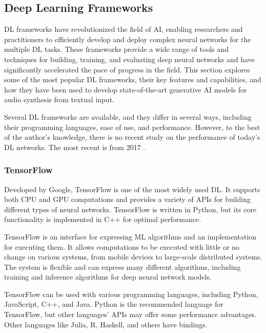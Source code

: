  \subsection{Deep Learning Frameworks} \label{sec:dl-frameworks}

\Ac{DL} frameworks have revolutionized the field of \ac{AI}, enabling researchers and practitioners to efficiently develop and deploy complex neural networks for the multiple \ac{DL} tasks. These frameworks provide a wide range of tools and techniques for building, training, and evaluating deep neural networks and have significantly accelerated the pace of progress in the field. This section explores some of the most popular \ac{DL} frameworks, their key features and capabilities, and how they have been used to develop state-of-the-art generative \ac{AI} models for audio synthesis from textual input.

Several \ac{DL} frameworks are available, and they differ in several ways, including their programming languages, ease of use, and performance. However, to the best of the author's knowledge, there is no recent study on the performance of today's \ac{DL} networks. The most recent is from 2017 \cite{parvat_survey_2017}.	

\subsubsection{TensorFlow} \label{sec:tensorflow}

Developed by Google, TensorFlow \cite{martin_abadi_tensorflow_2015} is one of the most widely used \ac{DL}. It supports both \ac{CPU} and \ac{GPU} computations and provides a variety of \acp{API} for building different types of neural networks. TensorFlow is written in Python, but its core functionality is implemented in C++ for optimal performance.

TensorFlow is an interface for expressing \ac{ML} algorithms and an implementation for executing them. It allows computations to be executed with little or no change on various systems, from mobile devices to large-scale distributed systems. The system is flexible and can express many different algorithms, including training and inference algorithms for deep neural network models.

TensorFlow can be used with various programming languages, including Python, JavaScript, C++, and Java. Python is the recommended language for TensorFlow, but other languages' \acp{API} may offer some performance advantages. Other languages like Julia, R, Haskell, and others have bindings.

